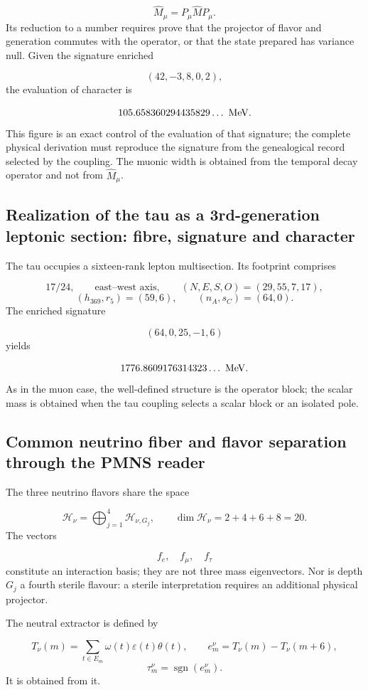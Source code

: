 \[
 \widehat M_\mu=P_\mu\widehat M P_\mu.
\]
Its reduction to a number requires prove that the projector of flavor and generation commutes with the operator, or that the state prepared has variance null. Given the signature enriched

\[
 (42,-3,8,0,2),
\]
the evaluation of character is

\[
 105.658360294435829\ldots\ {\rm MeV}.
\]
This figure is an exact control of the evaluation of that signature; the complete physical derivation must reproduce the signature from the genealogical record selected by the coupling. The muonic width is obtained from the temporal decay operator and not from \(\widehat M_\mu\).

\subsection{Realization of the tau as a 3rd-generation leptonic section: fibre, signature and character}
The tau occupies a sixteen-rank lepton multisection. Its footprint comprises

\[
 17/24,\qquad \text{east--west axis},\qquad
 (N,E,S,O)=(29,55,7,17),
\]
\[
 (h_{369},r_5)=(59,6),\qquad
 (n_A,s_C)=(64,0).
\]
The enriched signature

\[
 (64,0,25,-1,6)
\]
yields

\[
 1776.8609176314323\ldots\ {\rm MeV}.
\]
As in the muon case, the well-defined structure is the operator block; the scalar mass is obtained when the tau coupling selects a scalar block or an isolated pole.

\subsection{Common neutrino fiber and flavor separation through the PMNS reader}
The three neutrino flavors share the space

\[
 \mathcal H_\nu=
 \bigoplus_{j=1}^{4}\mathcal H_{\nu,G_j},
\qquad
 \dim\mathcal H_\nu=2+4+6+8=20.
\]
The vectors

\[
 f_e,\quad f_\mu,\quad f_\tau
\]
constitute an interaction basis; they are not three mass eigenvectors. Nor is depth \(G_j\) a fourth sterile flavour: a sterile interpretation requires an additional physical projector.

The neutral extractor is defined by

\[
 T_\nu(m)=\sum_{t\in E_m}
 \omega(t)\varepsilon(t)\theta(t),
\qquad
 e_m^\nu=T_\nu(m)-T_\nu(m+6),
\]
\[
 \tau_m^\nu=\operatorname{sgn}(e_m^\nu).
\]
It is obtained from it.


